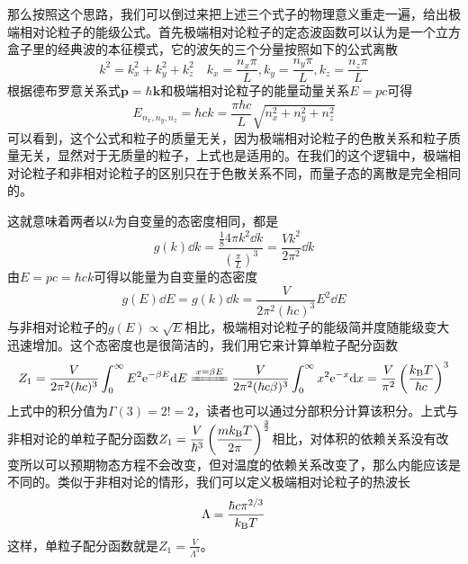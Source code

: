\documentclass[../../main.tex]{subfiles}
\begin{document}
那么按照这个思路，我们可以倒过来把上述三个式子的物理意义重走一遍，给出极端相对论粒子的能级公式。首先极端相对论粒子的定态波函数可以认为是一个立方盒子里的经典波的本征模式，它的波矢的三个分量按照如下的公式离散
\begin{equation}
    k^2=k_x^2+k_y^2+k_z^2 \quad k_x=\frac{n_x\pi}{L},k_y=\frac{n_y\pi}{L},k_z=\frac{n_z\pi}{L}
\end{equation}
根据德布罗意关系式\(\bm{p}=\hbar\bm{k}\)和极端相对论粒子的能量动量关系\(E=pc\)可得
\begin{equation}\label{eq:相对论自由粒子能级}
    E_{n_x,n_y,n_z}=\hbar ck=\frac{\pi\hbar c}{L}\sqrt{n_x^2+n_y^2+n_z^2}
\end{equation}
可以看到，这个公式和粒子的质量无关，因为极端相对论粒子的色散关系和粒子质量无关，显然对于无质量的粒子，上式也是适用的。在我们的这个逻辑中，极端相对论粒子和非相对论粒子的区别只在于色散关系不同，而量子态的离散是完全相同的。

这就意味着两者以\(k\)为自变量的态密度相同，都是
\begin{equation}
    g(k)\dd k=\frac{\frac{1}{8}4\pi k^2\dd k}{\left(\frac{\pi}{L}\right)^3}=\frac{Vk^2}{2\pi^2}\dd k
\end{equation}
由\(E=pc=\hbar ck\)可得以能量为自变量的态密度
\begin{equation}
    g(E)\dd E=g(k)\dd k=\frac{V}{2\pi^2(\hbar c)^3}E^2\dd E
\end{equation}
与非相对论粒子的\(g(E)\propto \sqrt{E}\)相比，极端相对论粒子的能级简并度随能级变大迅速增加。这个态密度也是很简洁的，我们用它来计算单粒子配分函数
\begin{equation}
    Z_1=\frac{V}{2\pi^2(\hbar c)^3}\int_0^{\infty}E^2\e^{-\beta E}\dd E\xlongequal{x=\beta E}\frac{V}{2\pi^2(\hbar c\beta)^3}\int_0^{\infty}x^2\e^{-x}\dd x=\frac{V}{\pi^2}\left(\frac{\k T}{\hbar c}\right)^3
\end{equation}
上式中的积分值为\(\Gamma(3)=2! =2 \)，读者也可以通过分部积分计算该积分。上式与非相对论的单粒子配分函数\(\displaystyle Z_1=\frac{V}{\hbar^3}\left(\frac{mk_{\mathrm{B}} T}{2\pi}\right)^{\frac{3}{2}}\)相比，对体积的依赖关系没有改变所以可以预期物态方程不会改变，但对温度的依赖关系改变了，那么内能应该是不同的。类似于非相对论的情形，我们可以定义极端相对论粒子的热波长
\begin{equation}
    \Lambda=\frac{\hbar c\pi^{2/3}}{k_{\mathrm{B}} T}
\end{equation}
这样，单粒子配分函数就是\(\displaystyle Z_1=\frac{V}{\Lambda^3}\)。
\end{document}
